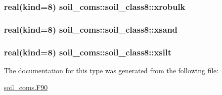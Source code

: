 \subsubsection[{\texorpdfstring{xrobulk}{xrobulk}}]{\setlength{\rightskip}{0pt plus 5cm}real(kind=8) soil\+\_\+coms\+::soil\+\_\+class8\+::xrobulk}\hypertarget{structsoil__coms_1_1soil__class8_a6a2e1db6e017a97a55dc174564431d97}{}\label{structsoil__coms_1_1soil__class8_a6a2e1db6e017a97a55dc174564431d97}
\subsubsection[{\texorpdfstring{xsand}{xsand}}]{\setlength{\rightskip}{0pt plus 5cm}real(kind=8) soil\+\_\+coms\+::soil\+\_\+class8\+::xsand}\hypertarget{structsoil__coms_1_1soil__class8_a24675f7b8a4831107b789f2a0baf1ce0}{}\label{structsoil__coms_1_1soil__class8_a24675f7b8a4831107b789f2a0baf1ce0}
\subsubsection[{\texorpdfstring{xsilt}{xsilt}}]{\setlength{\rightskip}{0pt plus 5cm}real(kind=8) soil\+\_\+coms\+::soil\+\_\+class8\+::xsilt}\hypertarget{structsoil__coms_1_1soil__class8_a1f3b706650a31e7a27f5d42c21c97bfd}{}\label{structsoil__coms_1_1soil__class8_a1f3b706650a31e7a27f5d42c21c97bfd}


The documentation for this type was generated from the following file\+:\begin{DoxyCompactItemize}
\item 
\hyperlink{soil__coms_8_f90}{soil\+\_\+coms.\+F90}\end{DoxyCompactItemize}
